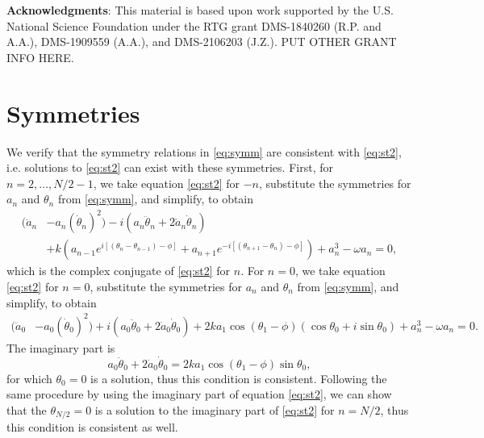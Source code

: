 \documentclass[11pt,reqno]{amsart}
\begin{document}
\vspace{0.5cm}
\textbf{Acknowledgments}: 
This material is based upon work supported by the U.S. National Science Foundation under the RTG grant DMS-1840260 (R.P. and A.A.), DMS-1909559 (A.A.), and DMS-2106203 (J.Z.). PUT OTHER GRANT INFO HERE.

\appendix

\section{Symmetries}\label{app:symm}

We verify that the symmetry relations in \cref{eq:symm} are consistent with \cref{eq:st2}, i.e. solutions to \cref{eq:st2} can exist with these symmetries. First, for $n = 2, \dots, N/2-1$, we take equation \cref{eq:st2} for $-n$, substitute the symmetries for $a_n$ and $\theta_n$ from \cref{eq:symm}, and simplify, to obtain 
\begin{equation*}
\begin{aligned}
(\ddot a_n &- a_n (\dot \theta_n)^2) 
- i ( a_n \ddot\theta_n + 2 \dot a_n \dot \theta_n )\\
&+ k\left(a_{n-1}e^{i[(\theta_n - \theta_{n-1}) - \phi]} + a_{n+1}e^{-i[(\theta_{n+1} - \theta_{n}) - \phi]} \right)+a_n^3 - \omega a_n = 0,
\end{aligned}
\end{equation*}	
which is the complex conjugate of \cref{eq:st2} for $n$. For $n = 0$, we take equation \cref{eq:st2} for $n=0$, substitute the symmetries for $a_n$ and $\theta_n$ from \cref{eq:symm}, and simplify, to obtain 
\begin{equation*}
\begin{aligned}
(\ddot a_0 &- a_0 (\dot \theta_0)^2) 
+ i ( a_0 \ddot\theta_0 + 2 \dot a_0 \dot \theta_0 )
+ 2 k a_1 \cos(\theta_1 - \phi)(\cos \theta_0 + i \sin \theta_0) + a_n^3 - \omega a_n = 0.
\end{aligned}
\end{equation*}
The imaginary part is
\begin{equation}\label{eq:n0imagpart}
a_0 \ddot\theta_0 + 2 \dot a_0 \dot \theta_0 = 2 k a_1 \cos(\theta_1 - \phi) \sin \theta_0,
\end{equation}
for which $\theta_0 = 0$ is a solution, thus this condition is consistent. Following the same procedure by using the imaginary part of equation \cref{eq:st2}, we can show that the $\theta_{N/2} = 0$ is a solution to the imaginary part of \cref{eq:st2} for $n=N/2$, thus this condition is consistent as well.
\end{document}
